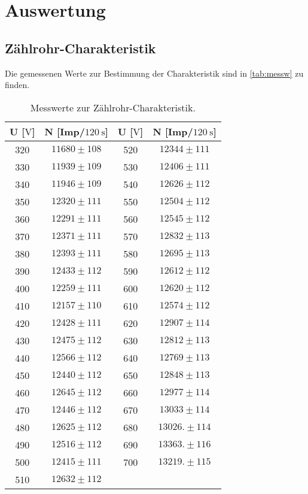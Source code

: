 \section{Auswertung}
\label{sec:Auswertung}

\subsection{Zählrohr-Charakteristik}

Die gemessenen Werte zur Bestimmung der Charakteristik sind in \autoref{tab:messw} zu finden.
\begin{table}[H]
  \caption{Messwerte zur Zählrohr-Charakteristik.}
  \label{tab:messw}
  \centering
  \begin{tabular}{c c c c}
      \toprule
      U [$\si{\volt}$] & N [Imp/$\SI{120}{\second}$] & U [$\si{\volt}$] & N [Imp/$\SI{120}{\second}$] \\
      \midrule
      320 & $ 11680 \pm 108 $ & 520 & $ 12344 \pm 111$ \\
      330 & $ 11939 \pm 109 $ & 530 & $ 12406 \pm 111$ \\
      340 & $ 11946 \pm 109 $ & 540 & $ 12626 \pm 112$ \\
      350 & $ 12320 \pm 111 $ & 550 & $ 12504 \pm 112$ \\
      360 & $ 12291 \pm 111 $ & 560 & $ 12545 \pm 112$ \\
      370 & $ 12371 \pm 111 $ & 570 & $ 12832 \pm 113$ \\
      380 & $ 12393 \pm 111 $ & 580 & $ 12695 \pm 113$ \\
      390 & $ 12433 \pm 112 $ & 590 & $ 12612 \pm 112$ \\
      400 & $ 12259 \pm 111 $ & 600 & $ 12620 \pm 112$ \\
      410 & $ 12157 \pm 110 $ & 610 & $ 12574 \pm 112$ \\
      420 & $ 12428 \pm 111 $ & 620 & $ 12907 \pm 114$ \\
      430 & $ 12475 \pm 112 $ & 630 & $ 12812 \pm 113$ \\
      440 & $ 12566 \pm 112 $ & 640 & $ 12769 \pm 113$ \\
      450 & $ 12440 \pm 112 $ & 650 & $ 12848 \pm 113$ \\
      460 & $ 12645 \pm 112 $ & 660 & $ 12977 \pm 114$ \\
      470 & $ 12446 \pm 112 $ & 670 & $ 13033 \pm 114$ \\
      480 & $ 12625 \pm 112 $ & 680 & $ 13026.\pm 114$ \\
      490 & $ 12516 \pm 112 $ & 690 & $ 13363.\pm 116$ \\
      500 & $ 12415 \pm 111 $ & 700 & $ 13219.\pm 115$ \\
      510 & $ 12632 \pm 112 $ &       &                \\
      \bottomrule
    \end{tabular}
\end{table}

